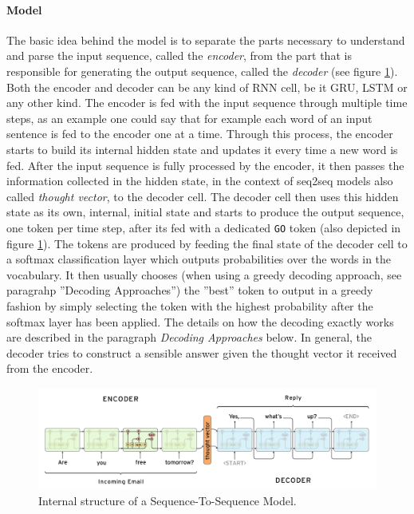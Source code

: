 \paragraph{Model}
The basic idea behind the model is to separate the parts necessary to understand and parse the input sequence, called the \emph{encoder}, from the part that is responsible for generating the output sequence, called the \emph{decoder} (see figure \ref{fundamentals:seq2seq:internal_structure}). Both the encoder and decoder can be any kind of RNN cell, be it GRU, LSTM or any other kind. The encoder is fed with the input sequence through multiple time steps, as an example one could say that for example each word of an input sentence is fed to the encoder one at a time. Through this process, the encoder starts to build its internal hidden state and updates it every time a new word is fed. After the input sequence is fully processed by the encoder, it then passes the information collected in the hidden state, in the context of seq2seq models also called \emph{thought vector}, to the decoder cell. The decoder cell then uses this hidden state as its own, internal, initial state and starts to produce the output sequence, one token per time step, after its fed with a dedicated \texttt{GO} token (also depicted in figure \ref{fundamentals:seq2seq:internal_structure}). The tokens are produced by feeding the final state of the decoder cell to a softmax classification layer which outputs probabilities over the words in the vocabulary. It then usually chooses (when using a greedy decoding approach, see paragrahp ''Decoding Approaches'') the ''best'' token to output in a greedy fashion by simply selecting the token with the highest probability after the softmax layer has been applied. The details on how the decoding exactly works are described in the paragraph \emph{Decoding Approaches} below. In general, the decoder tries to construct a sensible answer given the thought vector it received from the encoder.

\begin{figure}[h]
	\label{fundamentals:seq2seq:internal_structure}
	\centering
	\includegraphics[width=12cm]{img/seq2seq_internal}
	\caption{Internal structure of a Sequence-To-Sequence Model.\protect\footnotemark}
\end{figure}

